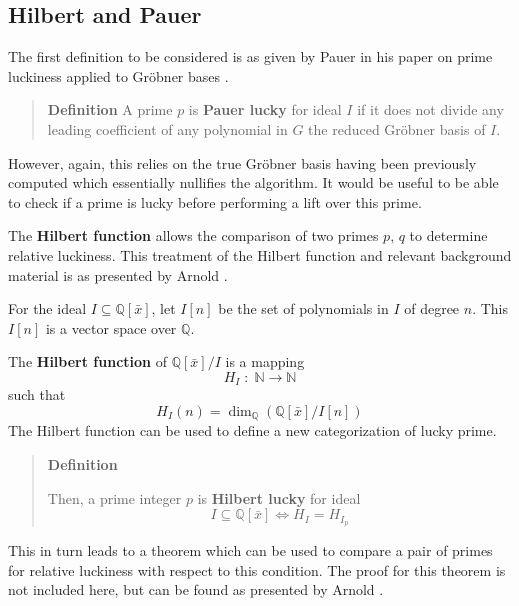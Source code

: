 \documentclass[letterpaper,12pt,titlepage,oneside,final]{book}
\newenvironment{defn}{\begin{quote}%
  \textbf{Definition }%
  \quad
}{%
\end{quote}%
}
\begin{document}
\subsection{Hilbert and Pauer}

The first definition to be considered is as given by Pauer in his paper on prime luckiness applied to Gr\"obner bases \cite{Pauer}.  

\begin{defn}\label{Pauer lucky}
  A prime ${p}$ is \textbf{Pauer lucky} for ideal ${I}$ if it does not divide any leading coefficient of any polynomial in ${G}$ the reduced Gr\"obner basis of ${I}$.
\end{defn}

However, again, this relies on the true Gr\"obner basis having been previously computed which essentially nullifies the algorithm.  It would be useful to be able to check if a prime is lucky before performing a lift over this prime.    

The \textbf{Hilbert function} allows the comparison of two primes ${p,\, q}$ to determine relative luckiness.  This treatment of the Hilbert function and relevant background material is as presented by Arnold \cite{Arnold}.  

For the ideal ${I \subseteq \mathbb{Q}[\bar x]}$, let ${I[n]}$ be the set of polynomials in ${I}$ of degree ${n}$.  This ${I[n]}$ is a vector space over ${\mathbb{Q}}$.  

The \textbf{Hilbert function} of ${\mathbb{Q}[\bar x]/I}$ is a mapping
\begin{equation*}
  H_I\; : \; \mathbb{N} \rightarrow \mathbb{N}
\end{equation*}
such that
\begin{equation*}
  H_I(n) = \dim_{\mathbb{Q}}(\mathbb{Q}[\bar x]/I[n])
\end{equation*}
The Hilbert function can be used to define a new categorization of lucky prime.
\begin{defn}
  Then, a prime integer ${p}$ is \textbf{Hilbert lucky} for ideal \begin{equation*}I \subseteq \mathbb{Q}[\bar x] \iff H_I = H_{I_p}\end{equation*}  
\end{defn}

This in turn leads to a theorem which can be used to compare a pair of primes for relative luckiness with respect to this condition.  The proof for this theorem is not included here, but can be found as presented by Arnold \cite{Arnold}.
\end{document}
